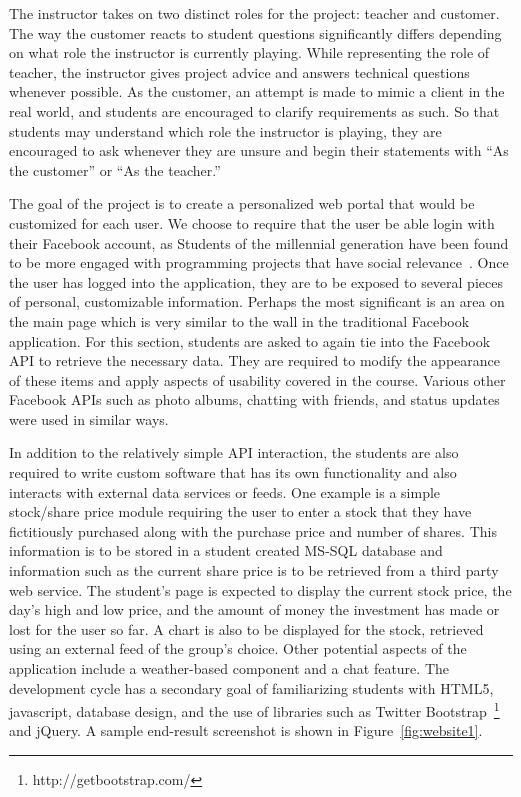 \documentclass{sig-alternate}
\begin{document}
The instructor takes on two distinct roles for the project: teacher and customer. The way the customer reacts to student questions significantly differs depending on what role the instructor is currently playing. While representing the role of teacher, the instructor gives project advice and answers technical questions whenever possible. As the customer, an attempt is made to mimic a client in the real world, and students are encouraged to clarify requirements as such. So that students may understand which role the instructor is playing, they are encouraged to ask whenever they are unsure and begin their statements with ``As the customer'' or ``As the teacher.''

The goal of the project is to create a personalized web portal that would be customized for each user. We choose to require that the user be able login with their Facebook account, as Students of the millennial generation have been found to be more engaged with programming projects that have social relevance~\cite{Meneely:2008:RRE:1384271.1384276}. Once the user has logged into the application, they are to be exposed to several pieces of personal, customizable information. Perhaps the most significant is an area on the main page which is very similar to the wall in the traditional Facebook application. For this section, students are asked to again tie into the Facebook API to retrieve the necessary data. They are required to modify the appearance of these items and apply aspects of usability covered in the course. Various other Facebook APIs such as photo albums, chatting with friends, and status updates were used in similar ways.


In addition to the relatively simple API interaction, the students are also required to write custom software that has its own functionality and also interacts with external data services or feeds. One example is a simple stock/share price module requiring the user to enter a stock that they have fictitiously purchased along with the purchase price and number of shares. This information is to be stored in a student created MS-SQL database and information such as the current share price is to be retrieved from a third party web service. The student's page is expected to display the current stock price, the day's high and low price, and the amount of money the investment has made or lost for the user so far. A chart is also to be displayed for the stock, retrieved using an external feed of the group's choice. Other potential aspects of the application include a weather-based component and a chat feature.  The development cycle has a secondary goal of familiarizing students with HTML5, javascript, database design, and the use of libraries such as Twitter Bootstrap~\footnote{http://getbootstrap.com/} and jQuery. A sample end-result screenshot is shown in Figure~\ref{fig:website1}.
\end{document}
